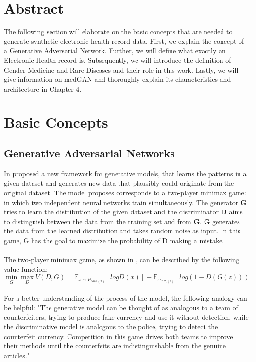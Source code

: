 \documentclass[11pt, a4paper]{book}
\begin{document}
\section{Abstract}
The following section will elaborate on the basic concepts that are needed to  generate synthetic electronic health record data.
First, we explain the concept of a Generative Adversarial Network. Further, we will define what exactly an Electronic Health record is. Subsequently, we will introduce the definition of Gender Medicine and Rare Diseases and their role in this work. Lastly, we will give information on medGAN and thoroughly explain its characteristics and architecture in Chapter 4.

\section{Basic Concepts}
\subsection{Generative Adversarial Networks}
In \cite{goodfellow2014generative} proposed a new framework for generative models, that learns the patterns in a given dataset and generates new data that plausibly could originate from the original dataset.
 The model \cite{Goodfellow2014} proposes corresponds to a two-player minimax game: in which two independent neural networks train simultaneously. The generator \textbf{G} tries to learn the distribution of the given dataset and the discriminator \textbf{D} aims to distinguish between the data from the training set and from \textbf{G}. \textbf{G} generates the data from the learned distribution and takes random noise as input. In this game, G has the goal to maximize the probability of D making a mistake.  
\\
\\
The two-player minimax game, as shown in \cite{Goodfellow2014}, can be described by the following value function:
\\
\begin{equation}
	\min_G\max_DV(D,G) = \mathbb{E}_{x\sim{P_{data(x)}}}[log D(x)] + \mathbb{E}_{z\sim_{P_z(z)}}[log(1 - D(G(z)))]
\end{equation}
\\

For a better understanding of the process of the model, the following analogy can be helpful:
"The generative model can be thought of as analogous to a team of counterfeiters, trying  to  produce  fake  currency  and  use  it  without  detection,  while  the  discriminative  model  is analogous to the police, trying to detect the counterfeit currency.  Competition in this game drives both teams to improve their methods until the counterfeits are indistinguishable from the genuine articles." \cite{goodfellow2014generative}
\end{document}
